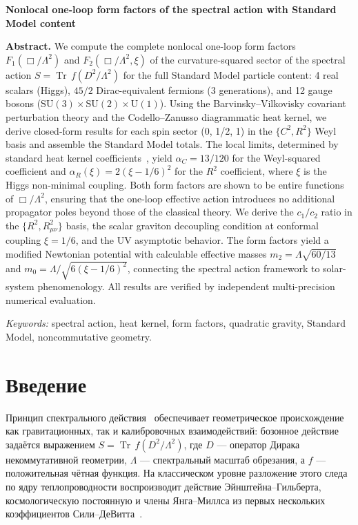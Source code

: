 \documentclass[12pt,a4paper]{article}
\newcommand{\Tr}{\operatorname{Tr}}
\begin{document}
\bigskip
{}
\textbf{Nonlocal one-loop form factors of the spectral action with Standard Model content}

\textbf{Abstract.}
We compute the complete nonlocal one-loop form factors $F_1(\Box/\Lambda^2)$
and $F_2(\Box/\Lambda^2,\xi)$ of the curvature-squared sector of the spectral
action $S = \Tr\,f(D^2/\Lambda^2)$ for the full Standard Model particle content:
4 real scalars (Higgs), $45/2$ Dirac-equivalent fermions (3 generations), and
12 gauge bosons ($\mathrm{SU}(3)\times\mathrm{SU}(2)\times\mathrm{U}(1)$).
Using the Barvinsky--Vilkovisky covariant perturbation theory and the
Codello--Zanusso diagrammatic heat kernel, we derive closed-form results for
each spin sector (0, 1/2, 1) in the $\{C^2, R^2\}$ Weyl basis and assemble the
Standard Model totals. The local limits, determined by standard heat kernel
coefficients~\cite{Gilkey:1975iq,Vassilevich:2003xt}, yield
$\alpha_C = 13/120$ for the Weyl-squared coefficient and
$\alpha_R(\xi) = 2(\xi-1/6)^2$ for the $R^2$ coefficient, where $\xi$ is the
Higgs non-minimal coupling. Both form factors are shown to be entire functions
of $\Box/\Lambda^2$, ensuring that the one-loop effective action introduces no
additional propagator poles beyond those of the classical theory.
We derive the $c_1/c_2$ ratio in the $\{R^2, R_{\mu\nu}^2\}$ basis, the scalar
graviton decoupling condition at conformal coupling $\xi = 1/6$, and the UV
asymptotic behavior. The form factors yield a modified Newtonian potential with
calculable effective masses $m_2 = \Lambda\sqrt{60/13}$ and
$m_0 = \Lambda/\sqrt{6(\xi-1/6)^2}$, connecting the spectral action framework
to solar-system phenomenology. All results are verified by independent
multi-precision numerical evaluation.

\textit{Keywords:} spectral action, heat kernel, form factors, quadratic gravity,
Standard Model, noncommutative geometry.


\section{Введение}
\label{sec:intro}

Принцип спектрального действия~\cite{Chamseddine:1996zu,Chamseddine:2006ep}
обеспечивает геометрическое происхождение как гравитационных, так и
калибровочных взаимодействий: бозонное действие задаётся выражением
$S = \Tr\,f(D^2/\Lambda^2)$, где $D$ --- оператор Дирака некоммутативной
геометрии, $\Lambda$ --- спектральный масштаб обрезания, а $f$ --- положительная
чётная функция. На классическом уровне разложение этого следа по ядру
теплопроводности воспроизводит действие Эйнштейна--Гильберта, космологическую
постоянную и члены Янга--Миллса из первых нескольких коэффициентов
Сили--ДеВитта~\cite{Chamseddine:2010ud,vanSuijlekom:2014pya}.
\end{document}
